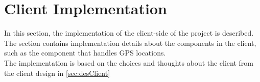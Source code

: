 \section{Client Implementation}
In this section, the implementation of the client-side of the project is described. The section contains implementation details about the components in the client, such as the component that handles GPS locations.\\

The implementation is based on the choices and thoughts about the client from the client design in \cref{sec:desClient}
